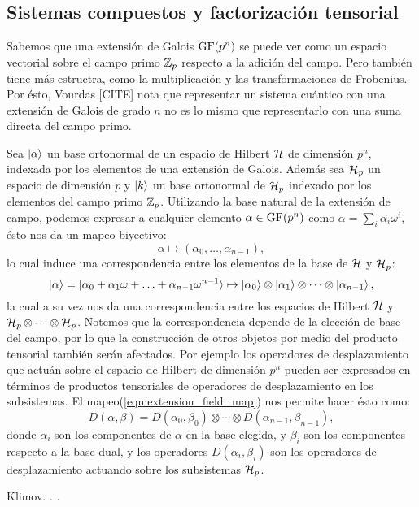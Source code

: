   \subsection{Sistemas compuestos y factorización tensorial}

  Sabemos que una extensión de Galois $\operatorname{GF}(p^{n})$ se puede
  ver como un espacio vectorial sobre el campo primo $\operatorname{\mathbb{Z}}_p$
  respecto a la adición del campo. Pero también tiene más
  estructra, como la multiplicación y las transformaciones
  de Frobenius. Por ésto, Vourdas [CITE] nota que
  representar un sistema cuántico con una extensión de
  Galois de grado $n$ no es lo mismo que representarlo con
  una suma directa del campo primo. 

  Sea $\ket{\alpha}$ un base ortonormal de un espacio de
  Hilbert $\operatorname{\mathcal H}$ de dimensión $p^{n}$, indexada por los
  elementos de una extensión de Galois. Además sea $\operatorname{\mathcal H}_p$ un
  espacio de dimensión $p$ y $\ket{k}$ un base ortonormal de
  $\operatorname{\mathcal H}_p$ indexado por los elementos del campo primo $\operatorname{\mathbb{Z}}_p$.
  Utilizando la base natural de la extensión de campo,
  podemos expresar a cualquier elemento $\alpha \in
  \operatorname{GF}(p^{n})$ como $\alpha = \sum_{i}^{} \alpha_i \omega^{i}
  $, ésto nos da un mapeo biyectivo:
  \begin{equation}
    \label{eqn:extension_field_map}
    \alpha \mapsto (\alpha_0,\ldots,\alpha_{n-1}),
  \end{equation} 
  lo cual induce una correspondencia entre los elementos de
  la base de $\operatorname{\mathcal H}$ y $\operatorname{\mathcal H}_p$:
  \begin{equation}
    \ket{\alpha}
    = \ket{\alpha_0 + \alpha_1 \omega + \ldots +
      \alpha_{n-1}\omega^{n-1}}
    \mapsto \ket{\alpha_0} \otimes \ket{\alpha_1} \otimes
    \cdots \otimes \ket{\alpha_{n-1}},
  \end{equation}
  la cual a su vez nos da una correspondencia entre los
  espacios de Hilbert $\operatorname{\mathcal H}$ y $\operatorname{\mathcal H}_p \otimes \cdots \otimes
  \operatorname{\mathcal H}_p$. Notemos que la correspondencia depende de la
  elección de base del campo, por lo que la construcción de
  otros objetos por medio del producto tensorial también
  serán afectados. Por ejemplo los operadores de
  desplazamiento que actuán sobre el espacio de Hilbert de
  dimensión $p^{n}$ pueden ser expresados en términos de
  productos tensoriales de operadores de desplazamiento en
  los subsistemas. El mapeo(\ref{eqn:extension_field_map})
  nos permite hacer ésto como:
  \begin{equation}
    D(\alpha,\beta)
    = D(\alpha_0, \beta_0) \otimes \cdots \otimes
    D(\alpha_{n-1}, \beta_{n-1}),
  \end{equation}
  donde $\alpha_i$ son los componentes de $\alpha$ en la
  base elegida, y $\beta_i$ son los componentes respecto a
  la base dual, y los operadores $D(\alpha_i,\beta_i)$ son
  los operadores de desplazamiento actuando sobre los
  subsistemas $\operatorname{\mathcal H}_p$.

  Klimov. . .
